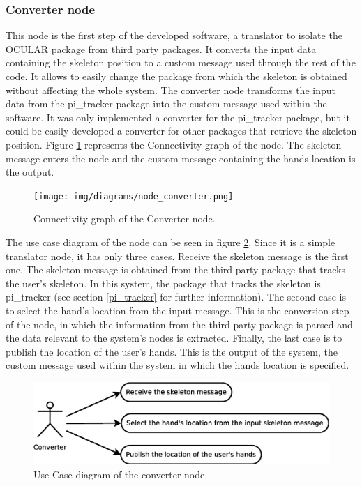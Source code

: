 




\subsubsection{Converter node}
		\label{converter}

	This node is the first step of the developed software, a translator to isolate the OCULAR package from third party packages. 
	It converts the input data containing the skeleton position to a custom message used through the rest of the code. 
	It allows to easily change the package from which the skeleton is obtained without affecting the whole system. 
	The converter node transforms the input data from the pi\_tracker package into the custom message used within the software. 
	It was only implemented a converter for the pi\_tracker package, but it could be easily developed a converter for other packages that retrieve the skeleton position. 
	Figure \ref{converter_graph} represents the Connectivity graph of the node. 
	The skeleton message enters the node and the custom message containing the hands location is the output. 

		\begin{figure}[H]
			\centering
			\texttt{[image: img/diagrams/node\_converter.png]}
			\caption[Converter node I/O]{Connectivity graph of the Converter node.}		
			\label{converter_graph}
		\end{figure}

	The use case diagram of the node can be seen in figure \ref{uc_converter}. 
	Since it is a simple translator node, it has only three cases. 
	Receive the skeleton message is the first one. 
	The skeleton message is obtained from the third party package that tracks the user's skeleton.
	In this system, the package that tracks the skeleton is pi\_tracker (see section \ref{pi_tracker} for further information). 
	The second case is to select the hand's location from the input message. 
	This is the conversion step of the node, in which the information from the third-party package is parsed and the data relevant to the system's nodes is extracted. 
	Finally, the last case is to publish the location of the user's hands. 
	This is the output of the system, the custom message used within the system in which the hands location is specified. 
	\begin{figure}[H]
		\centering
		\includegraphics[scale=0.4]{img/diagrams/uc_converter.eps}
		\caption[Use case diagram converter node]{Use Case diagram of the converter node}
		\label{uc_converter}
	\end{figure}

